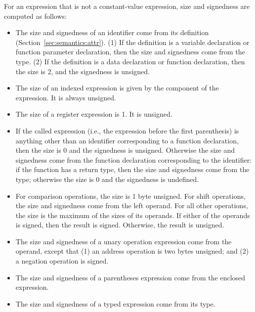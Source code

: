 \documentclass[10pt]{article}
\begin{document}
For an expression that is not a constant-value expression, size and
signedness are computed as follows:
%
\begin{itemize}
%
\item {} The size and signedness of an identifier
  come from its definition (Section~\ref{sec:semantics:attr}).  (1) If
  the definition is a variable declaration or function parameter
  declaration, then the size and signedness come from the type.  (2)
  If the definition is a data declaration or function declaration,
  then the size is 2, and the signedness is unsigned.
%
\item {} The size of an indexed expression
  is given by the  component of the
  expression.  It is always unsigned.
%
\item {} The size of a register expression
  is 1.  It is unsigned.
%
\item {} If the called expression (i.e., the
  expression before the first parenthesis) is anything other than an
  identifier corresponding to a function declaration, then the size is
  0 and the signedness is unsigned.  Otherwise the size and signedness
  come from the function declaration corresponding to the identifier:
  if the function has a return type, then the size and signedness come
  from the type; otherwise the size is 0 and the signedness is
  undefined.
%
\item {}  For comparison
  operations, the size is 1 byte unsigned.  For shift operations, the
  size and signedness come from the left operand.  For all other
  operations, the size is the maximum of the sizes of its operands.
  If either of the operands is signed, then the result is signed.
  Otherwise, the result is unsigned.
%
\item {} The size and signedness of
  a unary operation expression come from the operand, except that (1)
  an address operation  is two bytes unsigned; and (2) a
  negation operation is signed.
%
\item {} The size and signedness of a
  parentheses expression come from the enclosed expression.
%
\item {} The size and signedness of a typed
  expression come from its type.
%
\end{itemize}
\end{document}
